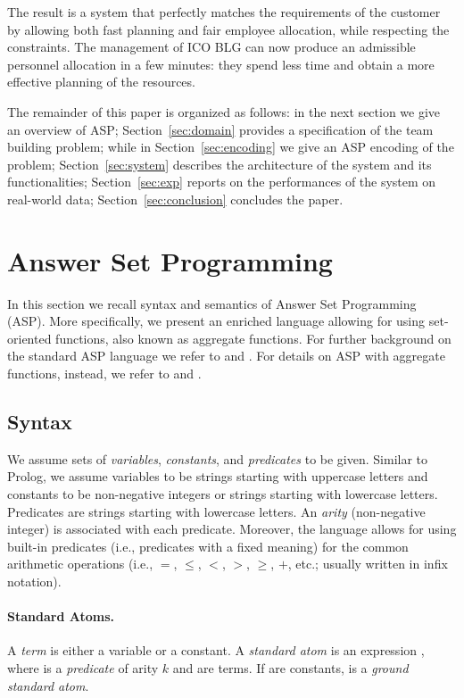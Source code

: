 \documentclass{tlp}
\begin{document}
The result is a system that perfectly matches the requirements of the customer by allowing
both fast planning and fair employee allocation, while respecting the constraints.
The management of ICO BLG can now produce an admissible personnel allocation
in a few minutes: they spend less time and obtain a more effective
planning of the resources.

\medskip

The remainder of this paper is organized as follows: in the next section we give an overview of ASP;
Section~\ref{sec:domain} provides a specification of the team building problem;
while in Section~\ref{sec:encoding} we give an ASP encoding of the problem;
Section~\ref{sec:system} describes the architecture of the system and its functionalities;
Section~\ref{sec:exp} reports on the performances of the system on real-world data;
Section~\ref{sec:conclusion} concludes the paper.


\section{Answer Set Programming}\label{sec:language}

In this section we recall syntax and semantics of Answer Set Programming (ASP).
More specifically, we present an enriched language allowing for using set-oriented functions, also known as aggregate functions.
For further background on the standard ASP language we refer to  and .
For details on ASP with aggregate functions, instead, we refer to  and .


\subsection{Syntax}

We assume sets of \emph{variables}, \emph{constants}, and \emph{predicates} to be given.
Similar to Prolog, we assume variables to be strings starting with uppercase letters and constants to be non-negative integers or strings starting with lowercase letters.
Predicates are strings starting with lowercase letters.
An \emph{arity} (non-negative integer) is associated with each predicate.
Moreover, the language allows for using built-in predicates (i.e., predicates with a fixed meaning) for the common arithmetic operations (i.e., $=$, $\le$, $<$, $>$, $\ge$, $+$, etc.; usually written in infix notation).


\paragraph{Standard Atoms.}
A {\em term} is either a variable or a constant.
A {\em standard atom} is an expression , where  is a {\em predicate} of arity $k$ and  are terms.
If  are constants,  is a {\em ground standard atom}.
\end{document}
